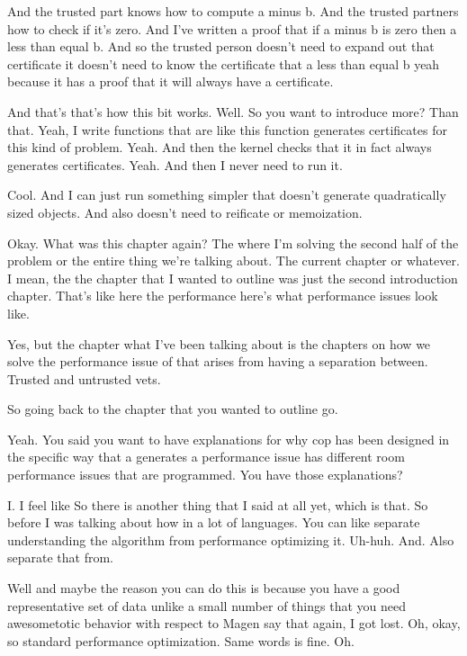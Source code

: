 \begin{subappendices}
    And the trusted part knows how to compute a minus b. And the trusted partners how to check if it's zero. And I've written a proof that if a minus b is zero then a less than equal b. And so the trusted person doesn't need to expand out that certificate it doesn't need to know the certificate that a less than equal b yeah because it has a proof that it will always have a certificate. 
    
    And that's that's how this bit works. Well. So you want to introduce more? Than that. Yeah, I write functions that are like this function generates certificates for this kind of problem. Yeah. And then the kernel checks that it in fact always generates certificates. Yeah. And then I never need to run it. 
    
    Cool. And I can just run something simpler that doesn't generate quadratically sized objects. And also doesn't need to reificate or memoization. 
    
    Okay. What was this chapter again? The where I'm solving the second half of the problem or the entire thing we're talking about. The current chapter or whatever. I mean, the the chapter that I wanted to outline was just the second introduction chapter. That's like here the performance here's what performance issues look like. 
    
    Yes, but the chapter what I've been talking about is the chapters on how we solve the performance issue of that arises from having a separation between. Trusted and untrusted vets. 
    
    So going back to the chapter that you wanted to outline go. 
    
    Yeah. You said you want to have explanations for why cop has been designed in the specific way that a generates a performance issue has different room performance issues that are programmed. You have those explanations? 
    
    I. I feel like So there is another thing that I said at all yet, which is that. So before I was talking about how in a lot of languages. You can like separate understanding the algorithm from performance optimizing it. Uh-huh. And. Also separate that from. 
    
    Well and maybe the reason you can do this is because you have a good representative set of data unlike a small number of things that you need awesometotic behavior with respect to Magen say that again, I got lost. Oh, okay, so standard performance optimization. Same words is fine. Oh. 
    

\end{subappendices}
